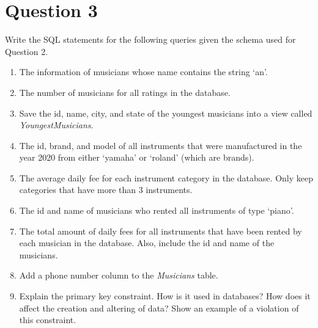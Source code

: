 \documentclass[letterpaper, 11pt]{article}
\begin{document}
\section*{Question 3}

Write the SQL statements for the following queries given the schema used for Question 2.

\begin{enumerate}[label={\alph*}.,leftmargin=*]
    \item The information of musicians whose name contains the string `an'.
    \item The number of musicians for all ratings in the database.
    \item Save the id, name, city, and state of the youngest musicians into a view called \textit{YoungestMusicians}.
    \item The id, brand, and model of all instruments that were manufactured in the year 2020 from either `yamaha' or `roland' (which are brands).
    \item The average daily fee for each instrument category in the database. Only keep categories that have more than 3 instruments.
    \item The id and name of musicians who rented all instruments of type `piano'.
    \item The total amount of daily fees for all instruments that have been rented by each musician in the database. Also, include the id and name of the musicians.
    \item Add a phone number column to the \textit{Musicians} table.
    \item Explain the primary key constraint. How is it used in databases? How does it affect the creation and altering of data? Show an example of a violation of this constraint.
\end{enumerate}
\end{document}
